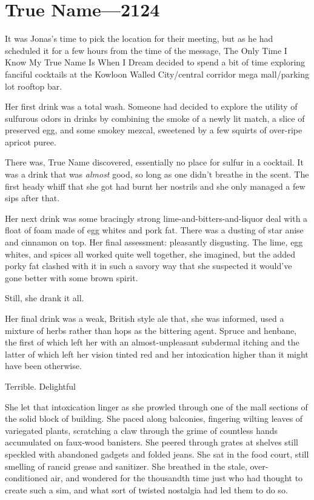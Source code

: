 \hypertarget{true-name-2124}{%
\chapter{True Name—2124}\label{true-name-2124}}

It was Jonas's time to pick the location for their meeting, but as he had scheduled it for a few hours from the time of the message, The Only Time I Know My True Name Is When I Dream decided to spend a bit of time exploring fanciful cocktails at the Kowloon Walled City/central corridor mega mall/parking lot rooftop bar.

Her first drink was a total wash. Someone had decided to explore the utility of sulfurous odors in drinks by combining the smoke of a newly lit match, a slice of preserved egg, and some smokey mezcal, sweetened by a few squirts of over-ripe apricot puree.

There was, True Name discovered, essentially no place for sulfur in a cocktail. It was a drink that was \emph{almost} good, so long as one didn't breathe in the scent. The first heady whiff that she got had burnt her nostrils and she only managed a few sips after that.

Her next drink was some bracingly strong lime-and-bitters-and-liquor deal with a float of foam made of egg whites and pork fat. There was a dusting of star anise and cinnamon on top. Her final assessment: pleasantly disgusting. The lime, egg whites, and spices all worked quite well together, she imagined, but the added porky fat clashed with it in such a savory way that she suspected it would've gone better with some brown spirit.

Still, she drank it all.

Her final drink was a weak, British style ale that, she was informed, used a mixture of herbs rather than hops as the bittering agent. Spruce and henbane, the first of which left her with an almost-unpleasant subdermal itching and the latter of which left her vision tinted red and her intoxication higher than it might have been otherwise.

Terrible. Delightful

She let that intoxication linger as she prowled through one of the mall sections of the solid block of building. She paced along balconies, fingering wilting leaves of variegated plants, scratching a claw through the grime of countless hands accumulated on faux-wood banisters. She peered through grates at shelves still speckled with abandoned gadgets and folded jeans. She sat in the food court, still smelling of rancid grease and sanitizer. She breathed in the stale, over-conditioned air, and wondered for the thousandth time just who had thought to create such a sim, and what sort of twisted nostalgia had led them to do so.

